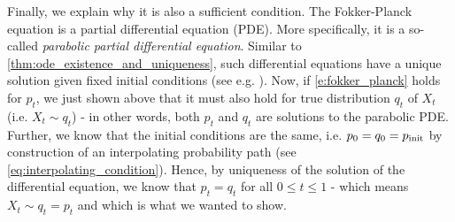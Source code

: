 Finally, we explain why it is also a sufficient condition. The Fokker-Planck equation is a partial differential equation (PDE). More specifically, it is a so-called \emph{parabolic partial differential equation}. Similar to \cref{thm:ode_existence_and_uniqueness}, such differential equations have a unique solution given fixed initial conditions (see e.g. \citep[Chapter 7]{evans2022partial}). Now, if \cref{e:fokker_planck} holds for $p_t$, we just shown above that it must also hold for true distribution $q_t$ of $X_t$ (i.e. $X_t\sim q_t$) - in other words, both $p_t$ and $q_t$ are solutions to the parabolic PDE. Further, we know that the initial conditions are the same, i.e. $p_0=q_0=p_{\rm{init}}$ by construction of an interpolating probability path (see \cref{eq:interpolating_condition}). Hence, by uniqueness of the solution of the differential equation, we know that $p_t=q_t$ for all $0\leq t\leq 1$ - which means $X_t\sim q_t=p_t$ and which is what we wanted to show.